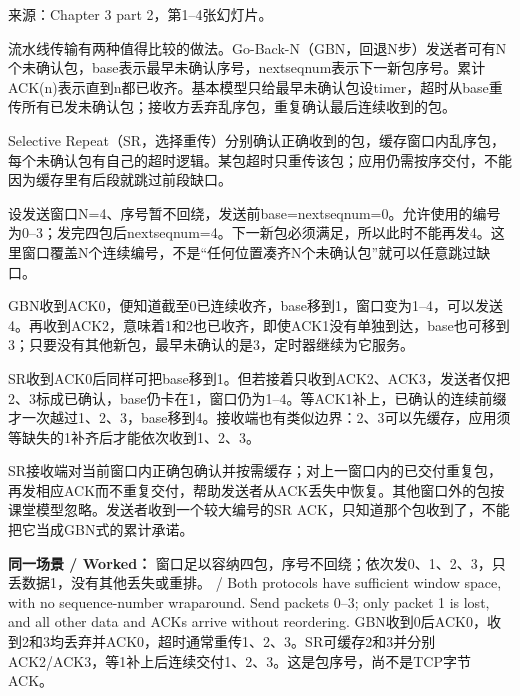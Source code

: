 来源：Chapter 3 part 2，第1–4张幻灯片。








流水线传输有两种值得比较的做法。Go-Back-N（GBN，回退N步）发送者可有N个未确认包，base表示最早未确认序号，nextseqnum表示下一新包序号。累计ACK(n)表示直到n都已收齐。基本模型只给最早未确认包设timer，超时从base重传所有已发未确认包；接收方丢弃乱序包，重复确认最后连续收到的包。


Selective Repeat（SR，选择重传）分别确认正确收到的包，缓存窗口内乱序包，每个未确认包有自己的超时逻辑。某包超时只重传该包；应用仍需按序交付，不能因为缓存里有后段就跳过前段缺口。





设发送窗口N=4、序号暂不回绕，发送前base=nextseqnum=0。允许使用的编号为0–3；发完四包后nextseqnum=4。下一新包必须满足，所以此时不能再发4。这里窗口覆盖N个连续编号，不是“任何位置凑齐N个未确认包”就可以任意跳过缺口。


GBN收到ACK0，便知道截至0已连续收齐，base移到1，窗口变为1–4，可以发送4。再收到ACK2，意味着1和2也已收齐，即使ACK1没有单独到达，base也可移到3；只要没有其他新包，最早未确认的是3，定时器继续为它服务。


SR收到ACK0后同样可把base移到1。但若接着只收到ACK2、ACK3，发送者仅把2、3标成已确认，base仍卡在1，窗口仍为1–4。等ACK1补上，已确认的连续前缀才一次越过1、2、3，base移到4。接收端也有类似边界：2、3可以先缓存，应用须等缺失的1补齐后才能依次收到1、2、3。


SR接收端对当前窗口内正确包确认并按需缓存；对上一窗口内的已交付重复包，再发相应ACK而不重复交付，帮助发送者从ACK丢失中恢复。其他窗口外的包按课堂模型忽略。发送者收到一个较大编号的SR ACK，只知道那个包收到了，不能把它当成GBN式的累计承诺。


\textbf{同一场景 / Worked：} 窗口足以容纳四包，序号不回绕；依次发0、1、2、3，只丢数据1，没有其他丢失或重排。 / Both protocols have sufficient window space, with no sequence-number wraparound. Send packets 0–3; only packet 1 is lost, and all other data and ACKs arrive without reordering. GBN收到0后ACK0，收到2和3均丢弃并ACK0，超时通常重传1、2、3。SR可缓存2和3并分别ACK2/ACK3，等1补上后连续交付1、2、3。这是包序号，尚不是TCP字节ACK。


